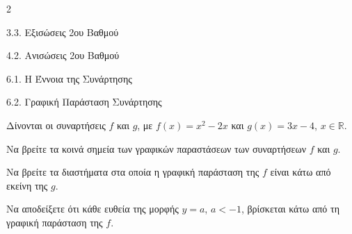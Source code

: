 \begin{ylh}{2}
    \item 3.3. Εξισώσεις 2ου Βαθμού
    \item 4.2. Ανισώσεις 2ου Βαθμού
    \item 6.1. Η Έννοια της Συνάρτησης
    \item 6.2. Γραφική Παράσταση Συνάρτησης
\end{ylh}
Δίνονται οι συναρτήσεις $f$ και $g$, με $f(x) = x^2 - 2x$ και $g(x) = 3x - 4$, $x \in \mathbb{R}$.\\
\begin{alist}
\item Να βρείτε τα κοινά σημεία των γραφικών παραστάσεων των συναρτήσεων $f$ και $g$.
\item Να βρείτε τα διαστήματα στα οποία η γραφική παράσταση της $f$ είναι κάτω από εκείνη της $g$.
\item Να αποδείξετε ότι κάθε ευθεία της μορφής $y = a$, $a < -1$, βρίσκεται κάτω από τη γραφική παράσταση της $f$.
\end{alist}

